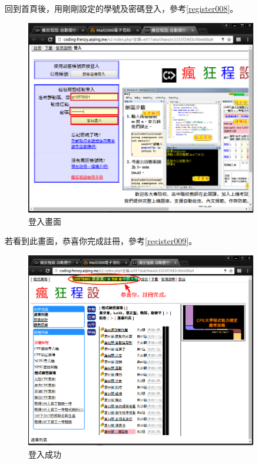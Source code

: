 \newpage
回到首頁後，用剛剛設定的學號及密碼登入，參考\autoref{register008}。


\begin{figure}[H]
	\centering
	\includegraphics[width=0.9\textwidth]{fig/install_and_setting/register_008}
	\caption{登入畫面}
	\label{register008}
\end{figure}

\newpage
若看到此畫面，恭喜你完成註冊，參考\autoref{register009}。

\begin{figure}[H]
	\centering
	\includegraphics[width=0.9\textwidth]{fig/install_and_setting/register_009}
	\caption{登入成功}
	\label{register009}
\end{figure}

